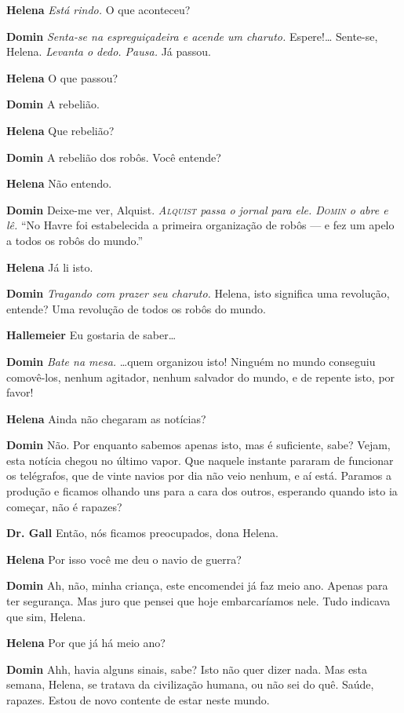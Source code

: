 \textbf{Helena} \emph{Está rindo.} O que aconteceu?

\textbf{Domin} \emph{Senta-se na espreguiçadeira e acende um charuto.} Espere!\ldots{}
Sente-se, Helena. \emph{Levanta o dedo. Pausa.} Já passou.

\textbf{Helena} O que passou?

\textbf{Domin} A rebelião.

\textbf{Helena} Que rebelião?

\textbf{Domin} A rebelião dos robôs. Você entende?

\textbf{Helena} Não entendo.

\textbf{Domin} Deixe-me ver, Alquist. \emph{\textsc{Alquist} passa o jornal para ele. \textsc{Domin} o abre
e lê.} ``No Havre foi estabelecida a primeira organização de robôs --- e fez um
apelo a todos os robôs do mundo.''

\textbf{Helena} Já li isto.

\textbf{Domin} \emph{Tragando com prazer seu charuto.} Helena, isto significa uma revolução, entende? 
Uma revolução de todos os robôs do mundo.

\textbf{Hallemeier} Eu gostaria de saber\ldots{}

\textbf{Domin} \emph{Bate na mesa.} \ldots{}quem organizou isto! Ninguém no mundo conseguiu
comovê-los, nenhum agitador, nenhum salvador do mundo, e de repente isto, por favor!

\textbf{Helena} Ainda não chegaram as notícias?

\textbf{Domin} Não. Por enquanto sabemos apenas isto, mas é suficiente, sabe? Vejam,
esta notícia chegou no último vapor. Que naquele instante pararam de
funcionar os telégrafos, que de vinte navios por dia não veio nenhum, e aí está.
Paramos a produção e ficamos olhando uns para a cara dos outros, esperando quando isto ia começar,
não é rapazes?

\textbf{Dr. Gall} Então, nós ficamos preocupados, dona Helena.

\textbf{Helena} Por isso você me deu o navio de guerra?

\textbf{Domin} Ah, não, minha criança, este encomendei já faz meio ano. Apenas para ter
segurança. Mas juro que pensei que hoje embarcaríamos nele. Tudo indicava que sim,
Helena.

\textbf{Helena} Por que já há meio ano?

\textbf{Domin} Ahh, havia alguns sinais, sabe? Isto não quer dizer nada. Mas esta
semana, Helena, se tratava da civilização humana, ou não sei do quê. Saúde,
rapazes. Estou de novo contente de estar neste mundo.


